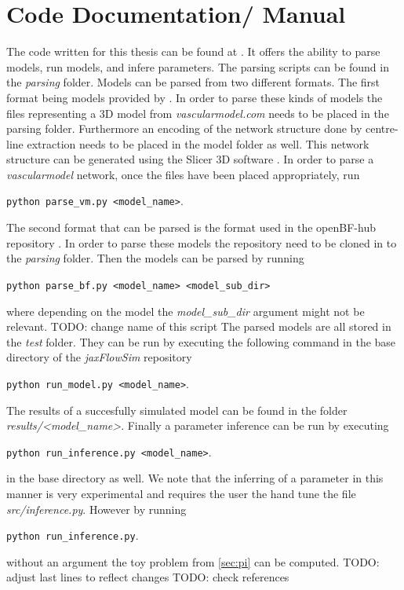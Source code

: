 \documentclass[a4paper, oneside]{discothesis}
\begin{document}



\appendix
\chapter{Code Documentation/ Manual} \label{app:doc}
The code written for this thesis can be found at \cite{jaxflowsim}.
It offers the ability to parse models, run models, and infere parameters.
The parsing scripts can be found in the \emph{parsing} folder.
Models can be parsed from two different formats.
The first format being models provided by \cite{vascularmodel}.
In order to parse these kinds of models the files representing a 3D model from \emph{vascularmodel.com} needs to be placed in the parsing folder.
Furthermore an encoding of the network structure done by centre-line extraction needs to be placed in the model folder as well.
This network structure can be generated using the Slicer 3D software \cite{fedorov20123d}.
In order to parse a \emph{vascularmodel} network, once the files have been placed appropriately, run

\texttt{python parse\_vm.py <model\_name>}.

The second format that can be parsed is the format used in the openBF-hub repository \cite{openbfhub}.
In order to parse these models the repository need to be cloned in to the \emph{parsing} folder.
Then the models can be parsed by running

\texttt{python parse\_bf.py <model\_name> <model\_sub\_dir>}

where depending on the model the \emph{model\_sub\_dir} argument might not be relevant. TODO: change name of this script
The parsed models are all stored in the \emph{test} folder.
They can be run by executing the following command in the base directory of the \emph{jaxFlowSim} repository

\texttt{python run\_model.py <model\_name>}.

The results of a succesfully simulated model can be found in the folder \emph{results/<model\_name>}.
Finally a parameter inference can be run by executing

\texttt{python run\_inference.py <model\_name>}.

in the base directory as well.
We note that the inferring of a parameter in this manner is very experimental and requires the user the hand tune the file \emph{src/inference.py}.
However by running 

\texttt{python run\_inference.py}.

without an argument the toy problem from \autoref{sec:pi} can be computed.
TODO: adjust last lines to reflect changes
TODO: check references
\end{document}
